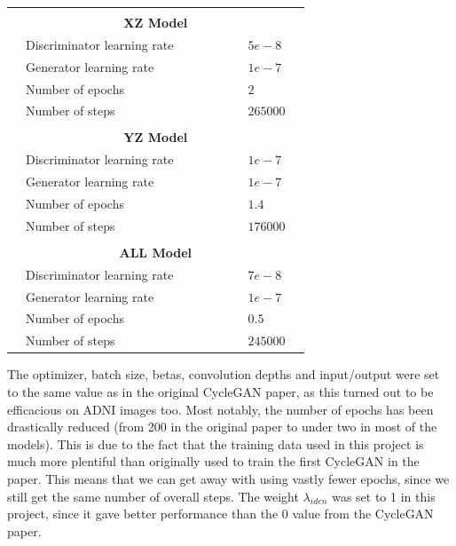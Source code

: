 \documentclass[11pt, fleqn, titlepage]{article}
\newcommand{\1}[1]{\mathds{1}\left[#1\right]}
\begin{document}
\begin{table}[H]
\begin{tabular}{l l l l l l l l l}
		&                             &&&&& &               & \\
		& \multicolumn{7}{c}{\textbf{XZ Model}}             & \\
		& Discriminator learning rate &&&&& & $5e-8$        & \\
		& Generator learning rate     &&&&& & $1e-7$        & \\
		& Number of epochs            &&&&& & $2$           & \\
		& Number of steps             &&&&& & $265000$      & \\
		&                             &&&&& &               & \\
		& \multicolumn{7}{c}{\textbf{YZ Model}}             & \\
		& Discriminator learning rate &&&&& & $1e-7$        & \\
		& Generator learning rate     &&&&& & $1e-7$        & \\
		& Number of epochs            &&&&& & $1.4$         & \\
		& Number of steps             &&&&& & $176000$      & \\
		&                             &&&&& &               & \\
		& \multicolumn{7}{c}{\textbf{ALL Model}}            & \\
		& Discriminator learning rate &&&&& & $7e-8$        & \\
		& Generator learning rate     &&&&& & $1e-7$        & \\
		& Number of epochs            &&&&& & $0.5$         & \\		
		& Number of steps             &&&&& & $245000$      & \\
		\bottomrule
	\end{tabular}
\end{table} 
The optimizer, batch size, betas, convolution depths and input/output were set to the same value as in the original CycleGAN paper, as this turned out to be efficacious on ADNI images too. Most notably, the number of epochs has been drastically reduced (from 200 in the original paper to under two in most of the models). This is due to the fact that the training data used in this project is much more plentiful than originally used to train the first CycleGAN in the paper. This means that we can get away with using vastly fewer epochs, since we still get the same number of overall steps. The weight $\lambda_{iden}$ was set to 1 in this project, since it gave better performance than the 0 value from the CycleGAN paper.
\end{document}
